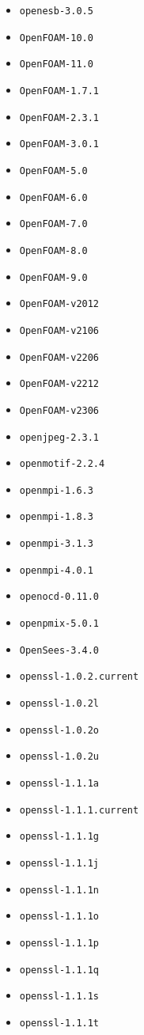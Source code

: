 \begin{itemize}
\item \verb|openesb-3.0.5|
\item \verb|OpenFOAM-10.0|
\item \verb|OpenFOAM-11.0|
\item \verb|OpenFOAM-1.7.1|
\item \verb|OpenFOAM-2.3.1|
\item \verb|OpenFOAM-3.0.1|
\item \verb|OpenFOAM-5.0|
\item \verb|OpenFOAM-6.0|
\item \verb|OpenFOAM-7.0|
\item \verb|OpenFOAM-8.0|
\item \verb|OpenFOAM-9.0|
\item \verb|OpenFOAM-v2012|
\item \verb|OpenFOAM-v2106|
\item \verb|OpenFOAM-v2206|
\item \verb|OpenFOAM-v2212|
\item \verb|OpenFOAM-v2306|
\item \verb|openjpeg-2.3.1|
\item \verb|openmotif-2.2.4|
\item \verb|openmpi-1.6.3|
\item \verb|openmpi-1.8.3|
\item \verb|openmpi-3.1.3|
\item \verb|openmpi-4.0.1|
\item \verb|openocd-0.11.0|
\item \verb|openpmix-5.0.1|
\item \verb|OpenSees-3.4.0|
\item \verb|openssl-1.0.2.current|
\item \verb|openssl-1.0.2l|
\item \verb|openssl-1.0.2o|
\item \verb|openssl-1.0.2u|
\item \verb|openssl-1.1.1a|
\item \verb|openssl-1.1.1.current|
\item \verb|openssl-1.1.1g|
\item \verb|openssl-1.1.1j|
\item \verb|openssl-1.1.1n|
\item \verb|openssl-1.1.1o|
\item \verb|openssl-1.1.1p|
\item \verb|openssl-1.1.1q|
\item \verb|openssl-1.1.1s|
\item \verb|openssl-1.1.1t|

\end{itemize}

